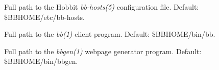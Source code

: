  \begin{description}
\item[] Full path to the Hobbit \emph{bb-hosts(5)}
 configuration file. Default: \$BBHOME/etc/bb-hosts. 

 

\item[] Full path to the \emph{bb(1)}
 client program. Default: \$BBHOME/bin/bb. 

 

\item[] Full path to the \emph{bbgen(1)}
 webpage generator program. Default: \$BBHOME/bin/bbgen. 

 


 


\end{description}

